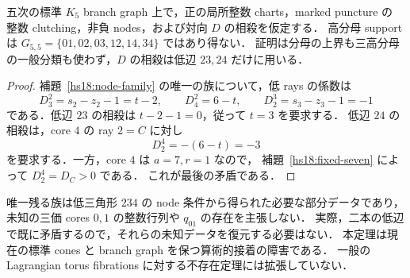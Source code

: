 \begin{theorem}
\label{hs18:no-house}
五次の標準 $K_5$ branch graph 上で，正の局所整数 charts，marked puncture の
整数 clutching，非負 nodes，および対向 $D$ の相殺を仮定する．
高分母 support は $G_{5,5}=\{01,02,03,12,14,34\}$ ではあり得ない．
証明は分母の上界も三高分母の一般分類も使わず，$D$ の相殺は低辺 $23,24$ だけに用いる．
\end{theorem}

\begin{proof}
補題~\ref{hs18:node-family} の唯一の族について，低 rays の係数は
\[
 D^2_3=s_2-z_2-1=t-2,\qquad D^2_4=6-t,\qquad
 D^3_2=s_3-z_3-1=-1
\]
である．低辺 $23$ の相殺は $t-2-1=0$，従って $t=3$ を要求する．
低辺 $24$ の相殺は，core $4$ の ray $2=C$ に対し
\[
 D^4_2=-(6-t)=-3
\]
を要求する．一方，core $4$ は $a=7,r=1$ なので，
補題~\ref{hs18:fixed-seven} によって $D^4_2=D_C>0$ である．
これが最後の矛盾である．
\end{proof}

唯一残る族は低三角形 $234$ の node 条件から得られた必要な部分データであり，
未知の三価 cores $0,1$ の整数行列や $q_{01}$ の存在を主張しない．
実際，二本の低辺で既に矛盾するので，それらの未知データを復元する必要はない．
本定理は現在の標準 cones と branch graph を保つ算術的接着の障害である．
一般の Lagrangian torus fibrations に対する不存在定理には拡張していない．
